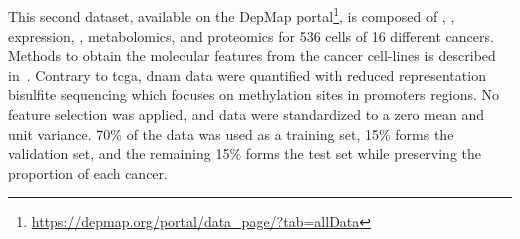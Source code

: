 \documentclass[../main.tex]{subfiles}
\begin{document}
	\subsection{}\label{sec:data_ccle}
		This second dataset, available on the DepMap portal\footnote{\url{https://depmap.org/portal/data_page/?tab=allData}}, is composed of , ,  expression, , metabolomics, and proteomics for 536 cells of 16 different cancers.
		Methods to obtain the molecular features from the cancer cell-lines is described in~\cite{CCLE}.
		Contrary to \gls{tcga}, \gls{dnam} data were quantified with reduced representation bisulfite sequencing which focuses on methylation sites in promoters regions.
		No feature selection was applied, and data were standardized to a zero mean and unit variance.
		70\% of the data was used as a training set, 15\% forms the validation set, and the remaining 15\% forms the test set while preserving the proportion of each cancer.
\end{document}
